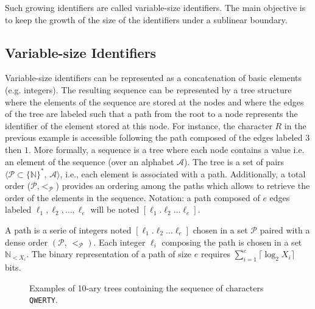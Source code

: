 Such growing identifiers are called variable-size identifiers. The main
objective is to keep the growth of the size of the identifiers under a sublinear
boundary.

\subsection{Variable-size Identifiers}
\label{subsec:variable}

Variable-size identifiers can be represented as a concatenation of basic
elements (e.g. integers). The resulting sequence can be represented by a tree
structure where the elements of the sequence are stored at the nodes and where
the edges of the tree are labeled such that a path from the root to a node
represents the identifier of the element stored at this node. For instance, the
character $R$ in the previous example is accessible following the path composed
of the edges labeled $3$ then $1$. More formally, a sequence is a tree where
each node contains a value i.e. an element of the sequence (over an alphabet
$\mathcal{A}$). The tree is a set of pairs
$\langle\mathcal{P}\subset\{\mathbb{N}\}^*,\, \mathcal{A} \rangle$, i.e., each
element is associated with a path. Additionally, a total order
($\mathcal{P}$,$<_{\mathcal{P}}$) provides an ordering among the paths which
allows to retrieve the order of the elements in the sequence. Notation: a path
composed of $e$ edges labeled $\ell_1,\ell_2,\ldots,\ell_e$ will be noted
$[\ell_1.\ell_2\ldots\ell_e]$.

\begin{definition}[Path]
  A path is a serie of integers noted $[\ell_1.\ell_2\ldots \ell_e]$ chosen in a
  set $\mathcal{P}$ paired with a dense order $(\mathcal{P},\, <_\mathcal{P})$.
  Each integer $\ell_i$ composing the path is chosen in a set
  $\mathbb{N}_{<X_i}$. The binary representation of a path of size $e$ requires
  $\textstyle \sum\nolimits_{i=1}^e \lceil \log_2 X_i\rceil$ bits.
\end{definition}


\begin{figure*}
  \centering
  \hspace{20pt}
  \caption{Examples of 10-ary trees containing the sequence of characters
    \texttt{QWERTY}.}
\end{figure*}


